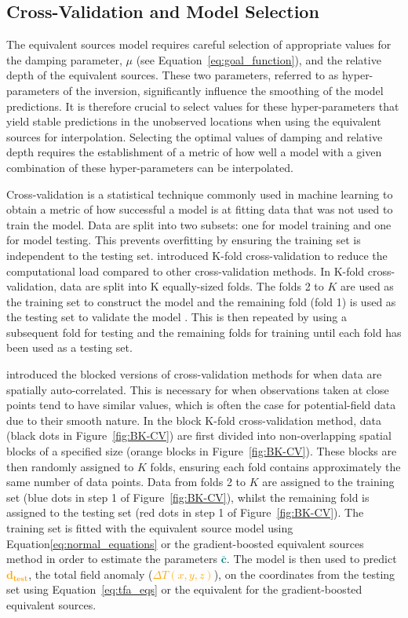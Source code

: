 \subsection{Cross-Validation and Model Selection}

The equivalent sources model requires careful selection of appropriate values for the damping parameter, $\mu$ (see Equation~\ref{eq:goal_function}), and the relative depth of the equivalent sources. These two parameters, referred to as hyper-parameters of the inversion, significantly influence the smoothing of the model predictions. It is therefore crucial to select values for these hyper-parameters that yield stable predictions in the unobserved locations when using the equivalent sources for interpolation. Selecting the optimal values of damping and relative depth requires the establishment of a metric of how well a model with a given combination of these hyper-parameters can be interpolated.

Cross-validation is a statistical technique commonly used in machine learning to obtain a metric of how successful a model is at fitting data that was not used to train the model. Data are split into two subsets: one for model training and one for model testing. This prevents overfitting by ensuring the training set is independent to the testing set. \citet{Geisser1975} introduced K-fold cross-validation to reduce the computational load compared to other cross-validation methods. In K-fold cross-validation, data are split into K equally-sized folds. The folds 2 to $K$ are used as the training set to construct the model and the remaining fold (fold 1) is used as the testing set to validate the model \citep{Jung2017}. This is then repeated by using a subsequent fold for testing and the remaining folds for training until each fold has been used as a testing set.

\citet{Roberts2017} introduced the blocked versions of cross-validation methods for when data are spatially auto-correlated. This is necessary for when observations taken at close points tend to have similar values, which is often the case for potential-field data due to their smooth nature. In the block K-fold cross-validation method, data (black dots in Figure~\ref{fig:BK-CV}) are first divided into non-overlapping spatial blocks of a specified size (orange blocks in Figure~\ref{fig:BK-CV}). These blocks are then randomly assigned to $K$ folds, ensuring each fold contains approximately the same number of data points. Data from folds 2 to $K$ are assigned to the training set (blue dots in step 1 of Figure~\ref{fig:BK-CV}), whilst the remaining fold is assigned to the testing set (red dots in step 1 of Figure~\ref{fig:BK-CV}). The training set is fitted with the equivalent source model using Equation\ref{eq:normal_equations} or the gradient-boosted equivalent sources method in order to estimate the parameters \textcolor{teal}{$\bar{\mathbf{c}}$}. The model is then used to predict \textcolor{orange}{$\mathbf{d_{test}}$}, the total field anomaly (\textcolor{orange}{$\Delta T (x, y, z)$}), on the coordinates from the testing set using Equation~\ref{eq:tfa_eqs} or the equivalent for the gradient-boosted equivalent sources.

